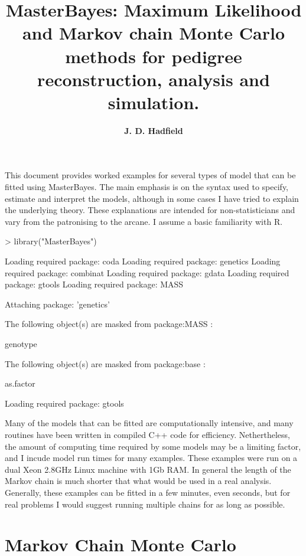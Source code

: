 \documentclass{article}
\title{\bf{\Large{MasterBayes: Maximum Likelihood and Markov chain Monte Carlo methods for pedigree reconstruction, analysis and simulation.}}}
\author{\bf{\large{J. D. Hadfield}}}
\begin{document}
\maketitle

\newpage

\tableofcontents

\newpage

This document provides worked examples for several types of model that can be fitted using MasterBayes.  The main emphasis is on the syntax used to specify, estimate and interpret the models, although in some cases I have tried to explain the underlying theory.  These explanations are intended for non-statisticians and vary from the patronising to the arcane. I assume a basic familiarity with R.

\begin{Schunk}
\begin{Sinput}
> library("MasterBayes")
\end{Sinput}
\begin{Soutput}
Loading required package: coda
Loading required package: genetics
Loading required package: combinat
Loading required package: gdata
Loading required package: gtools
Loading required package: MASS

Attaching package: 'genetics'


	The following object(s) are masked from package:MASS :

	 genotype 


	The following object(s) are masked from package:base :

	 as.factor 

Loading required package: gtools
\end{Soutput}
\end{Schunk}

Many of the models that can be fitted are computationally intensive, and many routines have been written in compiled C++ code for efficiency.  Nethertheless, the amount of computing time required by some models may be a limiting factor, and I incude model run times for many examples.  These examples were run on a dual Xeon 2.8GHz Linux machine with 1Gb RAM. In general the length of the Markov chain is much shorter that what would be used in a real analysis.  Generally, these examples can be fitted in a few minutes, even seconds, but for real problems I would suggest running multiple chains for as long as possible.  


\section{\large{Markov Chain Monte Carlo}}
\label{MCMC-sec}
\end{document}
